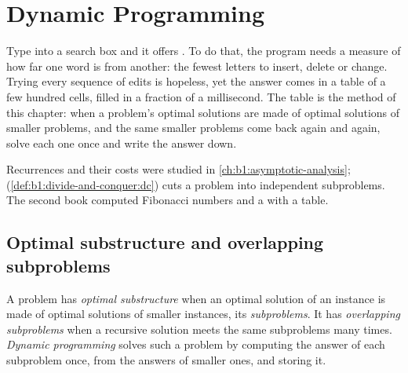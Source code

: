 \chapter{Dynamic Programming}\label{ch:b1:dynamic-programming}

Type  into a search box and it offers . To do that, the program needs a measure of how
far one word is from another: the fewest letters to insert, delete or change. Trying every sequence of edits is
hopeless, yet the answer comes in a table of a few hundred cells, filled in a fraction of a millisecond. The table is
the method of this chapter: when a problem's optimal solutions are made of optimal solutions of smaller problems, and
the same smaller problems come back again and again, solve each one once and write the answer down.

\begin{recall}
Recurrences and their costs were studied in \cref{ch:b1:asymptotic-analysis}; 
(\cref{def:b1:divide-and-conquer:dc}) cuts a problem into independent subproblems. The second book computed
Fibonacci numbers and a  with a table.
\end{recall}

\section{Optimal substructure and overlapping subproblems}\label{sec:b1:dynamic-programming:substructure}

\begin{definition}\label{def:b1:dynamic-programming:dp}
A problem has \emph{optimal substructure} when an optimal solution of an instance is made
of optimal solutions of smaller instances, its \emph{subproblems}. It has \emph{overlapping
subproblems} when a recursive solution meets the same subproblems many times.
\emph{Dynamic programming} solves such a problem by computing the answer of each subproblem
once, from the answers of smaller ones, and storing it.
\end{definition}

